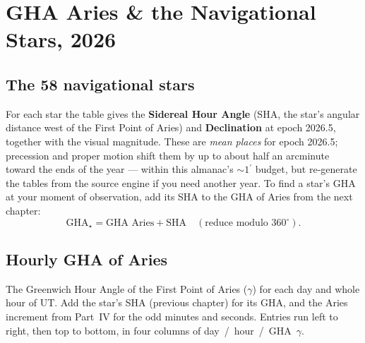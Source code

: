 \documentclass[10pt,letterpaper,twoside]{book}
\newcommand{\dg}{\ensuremath{{}^{\circ}}}
\newcommand{\pr}{\ensuremath{{}^{\prime}}}
\begin{document}













\part{GHA Aries \& the Navigational Stars, 2026}
\chapter{The 58 navigational stars}

For each star the table gives the \textbf{Sidereal Hour Angle} (SHA, the star's
angular distance west of the First Point of Aries) and \textbf{Declination} at
epoch 2026.5, together with the visual magnitude. These are \emph{mean places} for
epoch 2026.5; precession and proper motion shift them by up to about half an
arcminute toward the ends of the year --- within this almanac's $\sim\!1\pr$ budget,
but re-generate the tables from the source engine if you need another year. To find a star's
GHA at your moment of observation, add its SHA to the GHA of Aries from the next
chapter:
\[
  \text{GHA}_\star = \text{GHA Aries} + \text{SHA}\quad(\text{reduce modulo }360\dg).
\]



\chapter{Hourly GHA of Aries}

The Greenwich Hour Angle of the First Point of Aries ($\gamma$) for each day and
whole hour of UT. Add the star's SHA (previous chapter) for its GHA, and the Aries
increment from Part~IV for the odd minutes and seconds. Entries run left to right,
then top to bottom, in four columns of day~/~hour~/~GHA~$\gamma$.













\end{document}

